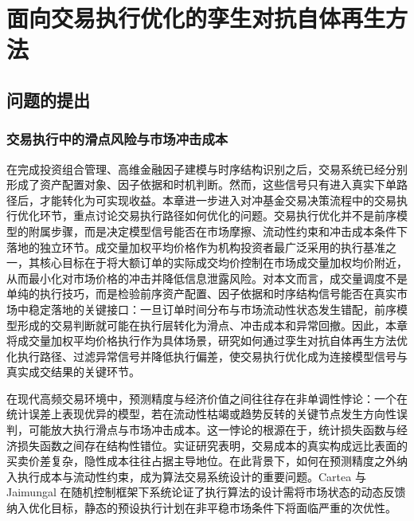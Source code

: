 \chapter{面向交易执行优化的孪生对抗自体再生方法}

\providecommand{\FloatBarrier}{}

\section{问题的提出}

\subsection{交易执行中的滑点风险与市场冲击成本}


在完成投资组合管理、高维金融因子建模与时序结构识别之后，交易系统已经分别形成了资产配置对象、因子依据和时机判断。然而，这些信号只有进入真实下单路径后，才能转化为可实现收益。本章进一步进入对冲基金交易决策流程中的交易执行优化环节，重点讨论交易执行路径如何优化的问题\cite{almgren2001optimal}。交易执行优化并不是前序模型的附属步骤，而是决定模型信号能否在市场摩擦、流动性约束和冲击成本条件下落地的独立环节。成交量加权平均价格作为机构投资者最广泛采用的执行基准之一，其核心目标在于将大额订单的实际成交均价控制在市场成交量加权均价附近，从而最小化对市场价格的冲击并降低信息泄露风险。对本文而言，成交量调度不是单纯的执行技巧，而是检验前序资产配置、因子依据和时序结构信号能否在真实市场中稳定落地的关键接口：一旦订单时间分布与市场流动性状态发生错配，前序模型形成的交易判断就可能在执行层转化为滑点、冲击成本和异常回撤。因此，本章将成交量加权平均价格执行作为具体场景，研究如何通过孪生对抗自体再生方法优化执行路径、过滤异常信号并降低执行偏差，使交易执行优化成为连接模型信号与真实成交结果的关键环节\cite{madhavan2002vwap}。

在现代高频交易环境中，预测精度与经济价值之间往往存在非单调性悖论：一个在统计误差上表现优异的模型，若在流动性枯竭或趋势反转的关键节点发生方向性误判，可能放大执行滑点与市场冲击成本。这一悖论的根源在于，统计损失函数与经济损失函数之间存在结构性错位。实证研究表明，交易成本的真实构成远比表面的买卖价差复杂，隐性成本往往占据主导地位\cite{berkowitz1988total}。在此背景下，如何在预测精度之外纳入执行成本与流动性约束，成为算法交易系统设计的重要问题。Cartea 与 Jaimungal 在随机控制框架下系统论证了执行算法的设计需将市场状态的动态反馈纳入优化目标，静态的预设执行计划在非平稳市场条件下将面临严重的次优性\cite{cartea2015algorithmic}。

